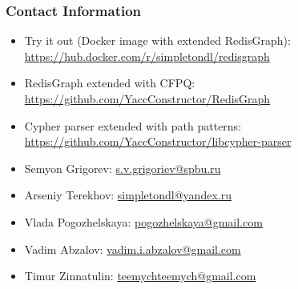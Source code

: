\documentclass[xcolor=table,aspectratio=169]{beamer}
\begin{document}
\begin{frame}
\frametitle{Contact Information}
\begin{minipage}[t]{0.8\textwidth}
\begin{itemize}
  \item Try it out (Docker image with extended RedisGraph): \url{https://hub.docker.com/r/simpletondl/redisgraph}
  \item RedisGraph extended with CFPQ: \url{https://github.com/YaccConstructor/RedisGraph}
  \item Cypher parser extended with path patterns: \url{https://github.com/YaccConstructor/libcypher-parser}

  \vspace{0.5cm}  
  \pause
  \item Semyon Grigorev: \href{mailto:s.v.grigoriev@spbu.ru}{s.v.grigoriev@spbu.ru}    
  \item Arseniy Terekhov: \href{mailto:simpletondl@yandex.ru}{simpletondl@yandex.ru}
  \item Vlada Pogozhelskaya: \href{mailto:pogozhelskaya@gmail.com}{pogozhelskaya@gmail.com}
  \item Vadim Abzalov: \href{mailto:vadim.i.abzalov@gmail.com}{vadim.i.abzalov@gmail.com}
  \item Timur Zinnatulin: \href{mailto:teemychteemych@gmail.com}{teemychteemych@gmail.com}
\end{itemize}
\end{minipage}~
\begin{minipage}[t]{0.19\textwidth}
\pause
\vspace{2.5cm}
\end{minipage}
\end{frame}
\end{document}
